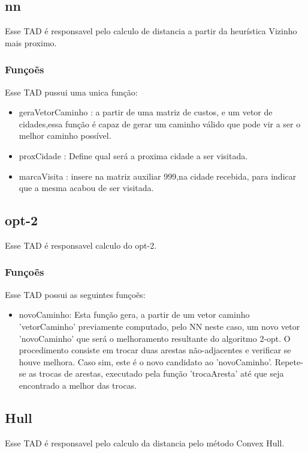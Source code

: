 \documentclass[a4paper,10pt]{article}
\begin{document}
  \subsection{nn}
 Esse TAD é responsavel pelo calculo de distancia a partir da heurística Vizinho mais proximo.

 \subsubsection{Funço\~es}
 Esse TAD pussui uma unica função:
 
  \begin{itemize}
   \item geraVetorCaminho : a partir de uma matriz de custos, e um vetor de cidades,essa função é capaz de 
    gerar um caminho válido que pode vir a ser o melhor caminho possível.
    
    \item proxCidade : Define qual será a proxima cidade a ser visitada.
    
    \item marcaVisita : insere na matriz auxiliar 999,na cidade recebida, para indicar que a mesma acabou de ser visitada. 
  \end{itemize}

  \subsection{opt-2}
  Esse TAD é responsavel calculo do opt-2.

   \subsubsection{Funço\~es}
   Esse TAD possui as seguintes funço\~es:
   
   \begin{itemize}
  \item novoCaminho: Esta função gera, a partir de um vetor caminho 'vetorCaminho' previamente computado, pelo NN neste caso, um novo vetor 'novoCaminho' que será o melhoramento resultante do algoritmo 2-opt. O procedimento consiste em trocar duas arestas não-adjacentes e verificar se houve melhora. Caso sim, este é o novo candidato ao 'novoCaminho'. Repete-se as trocas de arestas, executado pela função 'trocaAresta' até que seja encontrado a melhor das trocas.
\end{itemize}

  \subsection{Hull}
  Esse TAD é responsavel pelo calculo da distancia pelo método Convex Hull.
  
\end{document}
